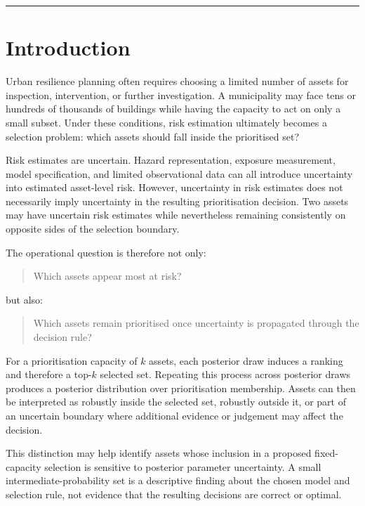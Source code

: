 \documentclass[
]{article}
\begin{document}
\begin{center}\rule{0.5\linewidth}{0.5pt}\end{center}

\section{Introduction}\label{introduction}

Urban resilience planning often requires choosing a limited number of
assets for inspection, intervention, or further investigation. A
municipality may face tens or hundreds of thousands of buildings while
having the capacity to act on only a small subset. Under these
conditions, risk estimation ultimately becomes a selection problem:
which assets should fall inside the prioritised set?

Risk estimates are uncertain. Hazard representation, exposure
measurement, model specification, and limited observational data can all
introduce uncertainty into estimated asset-level risk. However,
uncertainty in risk estimates does not necessarily imply uncertainty in
the resulting prioritisation decision. Two assets may have uncertain
risk estimates while nevertheless remaining consistently on opposite
sides of the selection boundary.

The operational question is therefore not only:

\begin{quote}
Which assets appear most at risk?
\end{quote}

but also:

\begin{quote}
Which assets remain prioritised once uncertainty is propagated through
the decision rule?
\end{quote}

For a prioritisation capacity of \(k\) assets, each posterior draw
induces a ranking and therefore a top-\(k\) selected set. Repeating this
process across posterior draws produces a posterior distribution over
prioritisation membership. Assets can then be interpreted as robustly
inside the selected set, robustly outside it, or part of an uncertain
boundary where additional evidence or judgement may affect the decision.

This distinction may help identify assets whose inclusion in a proposed
fixed-capacity selection is sensitive to posterior parameter
uncertainty. A small intermediate-probability set is a descriptive
finding about the chosen model and selection rule, not evidence that the
resulting decisions are correct or optimal.
\end{document}
